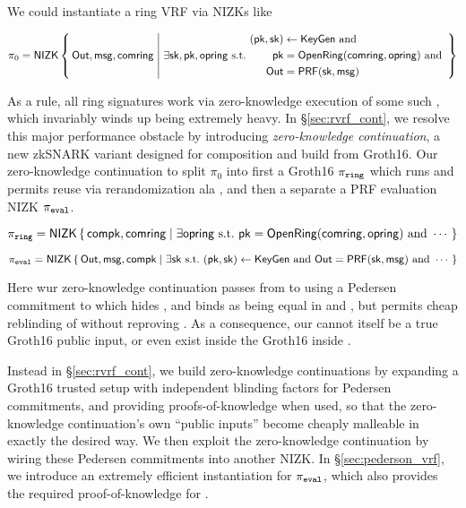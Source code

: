 We could instantiate a ring VRF via NIZKs like

$$ \pi_0 = \NIZK \Setst{ \Out, \msg, \comring }{
    \exists \sk, \pk, \openring \textrm{\ s.t.\ } 
    \begin{aligned}
        (\pk,\sk) &\leftarrow \KeyGen  \textrm{ and } \\
        \pk &= \OpenRing(\comring,\openring)  \textrm{ and } \\
        \Out &= \PRF(\sk,\msg)
    \end{aligned}
} $$

As a rule, all ring signatures work via zero-knowledge execution of
some such \OpenRing, which invariably winds up being extremely heavy.
In \S\ref{sec:rvrf_cont}, we resolve this major performance
obstacle by introducing {\em zero-knowledge continuation},
a new zkSNARK variant designed for composition and build from Groth16.
Our zero-knowledge continuation to split $\pi_0$ into first a Groth16
$\pi_{\mathtt{ring}}$ which runs \OpenRing and permits reuse via rerandomization
ala \cite[Theorem 3, Appendix C, pp. 31]{RandomizationGroth16},
and then a separate a PRF evaluation NIZK $\pi_{\mathtt{eval}}$.

$$ \piring = \NIZK \Setst{ \compk, \comring }{
    \exists \openring \textrm{\ s.t.\ } 
    \pk = \OpenRing(\comring,\openring) \textrm{ and } \cdots
} $$

$$ \pieval = \NIZK \Setst{ \Out, \msg, \compk }{
    \exists \sk \textrm{\ s.t.\ }
    (\pk,\sk) \leftarrow \KeyGen \textrm{ and }
    \Out = \PRF(\sk,\msg) \textrm{ and } \cdots
} $$

Here wur zero-knowledge continuation passes \pk from \piring to \pieval
using a Pedersen commitment \compk to \pk which hides \pk, and
binds \pk as being equal in \piring and \pieval, but permits cheap
 reblinding of \compk without reproving \piring.
As a consequence, our \compk cannot itself be a true Groth16 public input,
or even exist inside the Groth16 inside \piring.

Instead in \S\ref{sec:rvrf_cont}, we build zero-knowledge continuations
by expanding a Groth16 trusted setup with independent blinding factors
for Pedersen commitments, and providing proofs-of-knowledge when used,
so that the zero-knowledge continuation's own ``public inputs'' become
cheaply malleable in exactly the desired way.
We then exploit the zero-knowledge continuation by wiring these
Pedersen commitments into another NIZK.
%
In \S\ref{sec:pederson_vrf},
we introduce an extremely efficient instantiation for $\pi_{\mathtt{eval}}$, which
also provides the required proof-of-knowledge for \compk.


